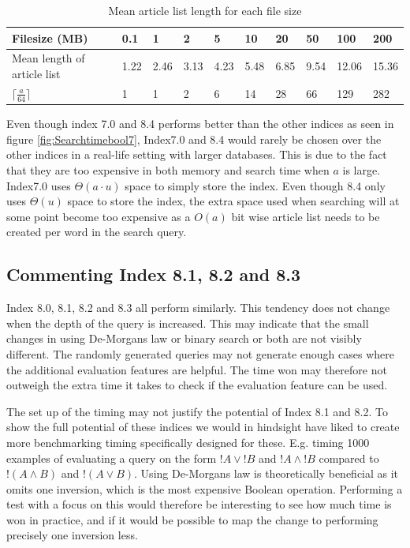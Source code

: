 \begin{table}[H]
\centering
\begin{tabular}{l|lllllllll}
 Filesize (MB)                           & 0.1 & 1     & 2      & 5      & 10 & 20     & 50     & 100 & 200 \\
 \hline 
Mean length of article list &  1.22   & 2.46     & 3.13      & 4.23      & 5.48      &  6.85     &  9.54    &  12.06      &  15.36      \\
  $\lceil \frac{a}{64} \rceil$                          &  1      & 1        & 2         &  6        & 14      &  28       &  66     & 129     &  282    
\end{tabular}
\caption{Mean article list length for each file size}
\label{tab:MeanArticlelengh_a26}
\end{table}

Even though index 7.0 and 8.4 performs better than the other indices as seen in figure \ref{fig:Searchtimebool7}, Index7.0 and 8.4 would rarely be chosen over the other indices in a real-life setting with larger databases. This is due to the fact that they are too expensive in both memory and search time when $a$ is large. Index7.0 uses $\Theta(a\cdot u)$ space to simply store the index. Even though 8.4 only uses $\Theta(u)$ space to store the index, the extra space used when searching will at some point become too expensive as a $O(a)$ bit wise article list needs to be created per word in the search query.

\subsection{Commenting Index 8.1, 8.2 and 8.3}

Index 8.0, 8.1, 8.2 and 8.3 all perform similarly. This tendency does not change when the depth of the query is increased. This may indicate that the small changes in using De-Morgans law or binary search or both are not visibly different. The randomly generated queries may not generate enough cases where the additional evaluation features are helpful. The time won may therefore not outweigh the extra time it takes to check if the evaluation feature can be used. 

The set up of the timing may not justify the potential of Index 8.1 and 8.2. To show the full potential of these indices we would in hindsight have liked to create more benchmarking timing specifically designed for these. E.g. timing 1000 examples of evaluating a query on the form $!A \vee ! B$ and $!A \wedge ! B$  compared to $!(A \wedge B)$ and $!(A \vee B)$. Using De-Morgans law is theoretically beneficial as it omits one inversion, which is the most expensive Boolean operation. Performing a test with a focus on this would therefore be interesting to see how much time is won in practice, and if it would be possible to map the change to performing precisely one inversion less.


